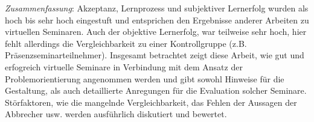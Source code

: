 \emph{Zusammenfassung}: Akzeptanz, Lernprozess und subjektiver
Lernerfolg wurden als hoch bis sehr hoch eingestuft und entsprichen den
Ergebnisse anderer Arbeiten zu virtuellen Seminaren. Auch der objektive
Lernerfolg, war teilweise sehr hoch, hier fehlt allerdings die
Vergleichbarkeit zu einer Kontrollgruppe (z.B.
Präsenzseminarteilnehmer). Insgesamt betrachtet zeigt diese Arbeit, wie
gut und erfogreich virtuelle Seminare in Verbindung mit dem Ansatz der
Problemorientierung angenommen werden und gibt sowohl Hinweise für die
Gestaltung, als auch detaillierte Anregungen für die Evaluation solcher
Seminare. Störfaktoren, wie die mangelnde Vergleichbarkeit, das Fehlen
der Aussagen der Abbrecher usw. werden ausführlich diskutiert und
bewertet.

\textbf{}

